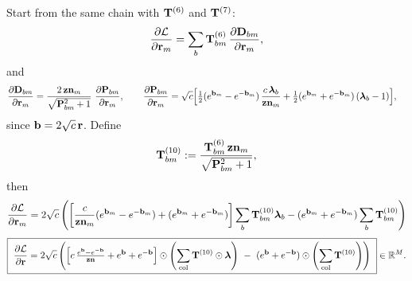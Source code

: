 \documentclass{article}
\begin{document}
Start from the same chain with $\T{6}$ and $\T{7}$:
\[
\ddfrac{\mathcal{L}}{\v{r}{m}}
= \sum_b \T{6}{bm}\,\ddfrac{\v{D}{bm}}{\v{r}{m}},
\]
and
\begin{align}
\ddfrac{\v{D}{bm}}{\v{r}{m}}
&= \frac{2\,\v{zn}{m}}{\sqrt{\v{P}{bm}^2+1}}\ \ddfrac{\v{P}{bm}}{\v{r}{m}},\qquad
\ddfrac{\v{P}{bm}}{\v{r}{m}}
= \sqrt{c}\Big[\tfrac12(\ev{b}{m}-\ev{-b}{m})\,\frac{c\,\lam_b}{\v{zn}{m}}
+ \tfrac12(\ev{b}{m}+\ev{-b}{m})\,(\lam_b-1)\Big],
\end{align}
since $\v{b}=2\sqrt{c}\,\v{r}$. Define
\[
\T{10}{bm}:=\frac{\T{6}{bm}\,\v{zn}{m}}{\sqrt{\v{P}{bm}^2+1}},
\]
then
\[
\ddfrac{\mathcal{L}}{\v{r}{m}}
= 2\sqrt{c}\left(
\left[\frac{c}{\v{zn}{m}}(\ev{b}{m}-\ev{-b}{m}) + (\ev{b}{m}+\ev{-b}{m})\right]\sum_b \T{10}{bm}\lam_b
- (\ev{b}{m}+\ev{-b}{m})\sum_b \T{10}{bm}
\right)
\]
\[
\boxed{\ \ddfrac{\mathcal{L}}{\v{r}} =
2\sqrt{c}\left(
\Big[c\,\tfrac{\ev{b}-\ev{-b}}{\v{zn}}+\ev{b}+\ev{-b}\Big]\odot \colnorm{\T{10}\odot\v{\lam}}
\ -\ (\ev{b}+\ev{-b})\odot \colnorm{\T{10}}
\right)\ }\in\mathbb{R}^{M}.
\]
\end{document}
